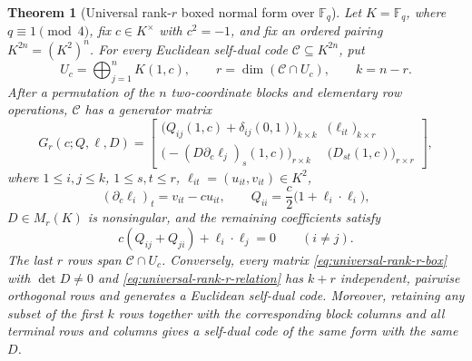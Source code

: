 \documentclass[12pt]{article}
\newtheorem{theorem}{Theorem}[section]
\newcommand{\F}{\mathbb{F}}
\begin{document}
\begin{theorem}[Universal rank-\(r\) boxed normal form over
\texorpdfstring{$\F_q$}{Fq}]
\label{thm:qary-universal-rank-r}
Let \(K=\F_q\), where \(q\equiv1\pmod4\), fix \(c\in K^\times\) with
\(c^2=-1\), and fix an ordered pairing \(K^{2n}=(K^2)^n\).  For every
Euclidean self-dual code \(\mathcal C\subseteq K^{2n}\), put
\[
 U_c=\bigoplus_{j=1}^n K(1,c),\qquad
 r=\dim(\mathcal C\cap U_c),\qquad k=n-r.
\]
After a permutation of the \(n\) two-coordinate blocks and elementary row
operations, \(\mathcal C\) has a generator matrix
\begin{equation}
G_r(c;Q,\ell,D)=
\left[
\begin{array}{c|c}
\bigl(Q_{ij}(1,c)+\delta_{ij}(0,1)\bigr)_{k\times k}
  & \bigl(\ell_{it}\bigr)_{k\times r}\\ \hline
\bigl(-(D\partial_c\ell_j)_s(1,c)\bigr)_{r\times k}
  & \bigl(D_{st}(1,c)\bigr)_{r\times r}
\end{array}
\right],
\label{eq:universal-rank-r-box}
\end{equation}
where \(1\le i,j\le k\), \(1\le s,t\le r\),
\(\ell_{it}=(u_{it},v_{it})\in K^2\),
\[
 (\partial_c\ell_i)_t=v_{it}-cu_{it},\qquad
 Q_{ii}=\frac c2\bigl(1+\ell_i\cdot\ell_i\bigr),
\]
\(D\in M_r(K)\) is nonsingular, and the remaining coefficients satisfy
\begin{equation}
 c(Q_{ij}+Q_{ji})+\ell_i\cdot\ell_j=0
\qquad(i\ne j).
\label{eq:universal-rank-r-relation}
\end{equation}
The last \(r\) rows span \(\mathcal C\cap U_c\).  Conversely, every matrix
\eqref{eq:universal-rank-r-box} with \(\det D\ne0\) and
\eqref{eq:universal-rank-r-relation} has \(k+r\) independent, pairwise
orthogonal rows and generates a Euclidean self-dual code.  Moreover,
retaining any subset of the first \(k\) rows together with the corresponding
block columns and all terminal rows and columns gives a self-dual code of
the same form with the same \(D\).
\end{theorem}
\end{document}
